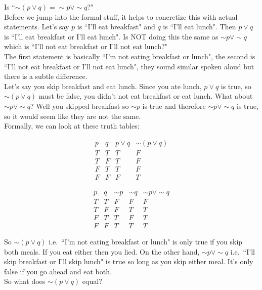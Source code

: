 \begin{example}
Is ``$\sim(p \vee q)=\sim p \vee \sim q$?"\\

Before we jump into the formal stuff, it helps to concretize this with actual statements.  Let's say $p$ is ``I'll eat breakfast" and $q$ is ``I'll eat lunch".  Then $p \vee q$ is ``I'll eat breakfast or I'll eat lunch".  Is NOT doing this the same as $\sim p \vee \sim q$ which is ``I'll not eat breakfast or I'll not eat lunch?"\\

The first statement is basically ``I'm not eating breakfast or lunch", the second is ``I'll not eat breakfast or I'll not eat lunch", they sound similar spoken aloud but there is a subtle difference.\\

Let's say you skip breakfast and eat lunch.  Since you ate lunch, $p\vee q$ is true, so $\sim(p\vee q)$ must be false, you didn't not eat breakfast or eat lunch.  What about $\sim p \vee \sim q$?  Well you skipped breakfast so $\sim p$ is true and therefore $\sim p \vee \sim q$ is true, so it would seem like they are not the same.\\

Formally, we can look at these truth tables:

$$\begin{array}{c|c|c|c}
p&q&p\vee q& \sim (p\vee q)\\
\hline
T & T&T&F\\
T&F&T&F\\
F&T&T&F\\
F&F&F&T
\end{array}$$

$$\begin{array}{c|c|c|c|c}
p&q&\sim p& \sim q & \sim p \vee \sim q\\
\hline
T & T&F&F&F\\
T&F&F&T&T\\
F&T&T&F&T\\
F&F&T&T&T
\end{array}$$

So $\sim(p\vee q)$ i.e.\ ``I'm not eating breakfast or lunch" is only true if you skip both meals.  If you eat either then you lied.  On the other hand, $\sim p \vee \sim q$ i.e.\  ``I'll skip breakfast or I'll skip lunch" is true so long as you skip either meal.  It's only false if you go ahead and eat both.\\

So what does $\sim(p \vee q)$ equal?
\end{example}

